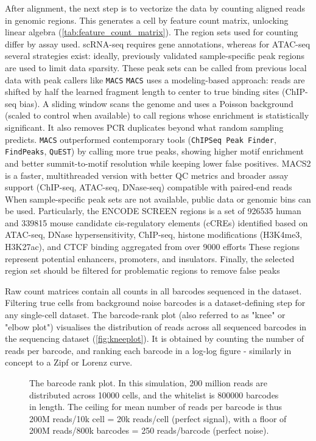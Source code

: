 After alignment, the next step is to vectorize the data by counting aligned reads in genomic regions. This generates a cell by feature count matrix, unlocking linear algebra (\autoref{tab:feature_count_matrix}). The region sets used for counting differ by assay used. scRNA-seq requires gene annotations, whereas for ATAC-seq several strategies exist: ideally, previously validated sample-specific peak regions are used to limit data sparsity. These peak sets can be called from previous local data with peak callers like \verb|MACS| \verb|MACS| uses a modeling-based approach: reads are shifted by half the learned fragment length to center to true binding sites (ChIP-seq bias). A sliding window scans the genome and uses a Poisson background (scaled to control when available) to call regions whose enrichment is statistically significant. It also removes PCR duplicates beyond what random sampling predicts. \verb|MACS| outperformed contemporary tools (\verb|ChIPSeq Peak Finder|, \verb|FindPeaks|, \verb|QuEST|) by calling more true peaks, showing higher motif enrichment and better summit-to-motif resolution while keeping lower false positives.  MACS2 is a faster, multithreaded version with better QC metrics and broader assay support (ChIP-seq, ATAC-seq, DNase-seq) compatible with paired-end reads When sample-specific peak sets are not available, public data or genomic bins can be used. Particularly, the ENCODE SCREEN regions is a set of \num{926535} human and \num{339815} mouse candidate cis-regulatory elements (cCREs) identified based on ATAC-seq, DNase hypersensitivity, ChIP-seq, histone modifications (H3K4me3, H3K27ac), and CTCF binding aggregated from over \num{9000} efforts These regions represent potential enhancers, promoters, and insulators. Finally, the selected region set should be filtered for problematic regions to remove false peaks

Raw count matrices contain all counts in all barcodes sequenced in the dataset. Filtering true cells from background noise barcodes is a dataset-defining step for any single-cell dataset. The barcode-rank plot (also referred to as "knee" or "elbow plot") visualises the distribution of reads across all sequenced barcodes in the sequencing dataset (\autoref{fig:kneeplot}). It is obtained by counting the number of reads per barcode, and ranking each barcode in a log-log figure - similarly in concept to a Zipf or Lorenz curve.

\begin{figure}[h]
	\centering
	\resizebox{0.8\textwidth}{!}{}
	\captionsetup{width=0.85\linewidth}
	\caption[Barcode rank simulation]{The barcode rank plot. In this simulation, 200 million reads are distributed across \num{10000} cells, and the whitelist is \num{800000} barcodes in length. The ceiling for mean number of reads per barcode is thus 200M reads/10k cell = 20k reads/cell (perfect signal), with a floor of 200M reads/800k barcodes = 250 reads/barcode (perfect noise).}
	\label{fig:kneeplot}
\end{figure}

